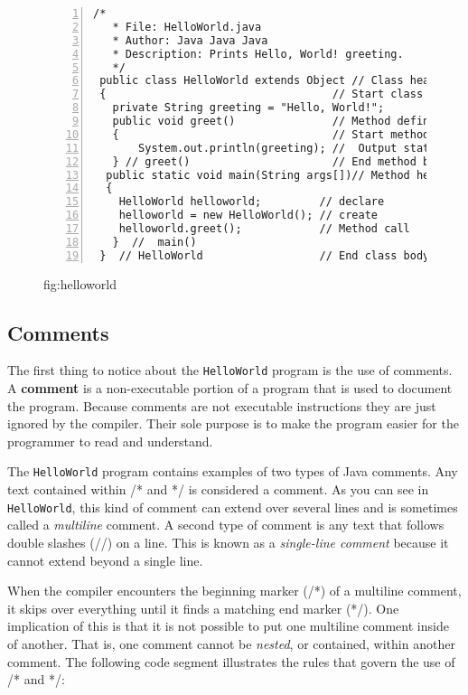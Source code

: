\begin{figure}[hb]
\jjjprogstart
\begin{jjjlisting}
\begin{lstlisting}[numberstyle=\small,numbers=left]
  /*
   * File: HelloWorld.java
   * Author: Java Java Java
   * Description: Prints Hello, World! greeting.
   */
 public class HelloWorld extends Object // Class header
 {                                   // Start class body
   private String greeting = "Hello, World!";  
   public void greet()               // Method definition
   {                                 // Start method body
       System.out.println(greeting); //  Output statement
   } // greet()                      // End method body
  public static void main(String args[])// Method header
  {                   
    HelloWorld helloworld;         // declare
    helloworld = new HelloWorld(); // create
    helloworld.greet();            // Method call
   }  //  main()
 }  // HelloWorld                  // End class body
\end{lstlisting}
\end{jjjlisting}
{fig:helloworld}
\end{figure}


\subsection{Comments}

\noindent The first thing to notice about the {\tt HelloWorld} program 
is the use of comments. A {\bf comment} is a non-executable portion of
a program that is used to document the program. Because comments are
not executable instructions they are just ignored by the compiler.
Their sole purpose is to make the program easier for the programmer to
read and understand.

The {\tt HelloWorld} program contains examples of two types of Java
comments.  Any text contained within /* and */ is considered a
comment.  As you can see in {\tt HelloWorld}, this kind of comment can
extend over several lines and is sometimes called a {\em multiline}
comment.  A second type of comment is any text that follows double
slashes (//) on a line.  This is known as a {\it single-line comment}
because it cannot extend beyond a single line.

When the compiler encounters the beginning marker (/*) of a multiline
comment, it skips over everything until it finds a matching end marker
(*/).  One implication of this is that it is not possible to put one
multiline comment inside of another. That is, one comment cannot be
{\it nested}, or contained, within another comment. The following code
segment illustrates the rules that govern the use of /* and */:


